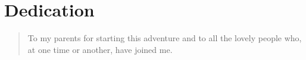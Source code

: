 \chapter*{Dedication}
\label{ch:list_of_appendices}
\begin{quote}
  To my parents for starting this adventure and to all the lovely people who, at one time or another, have joined me.
\end{quote}
\vfill
